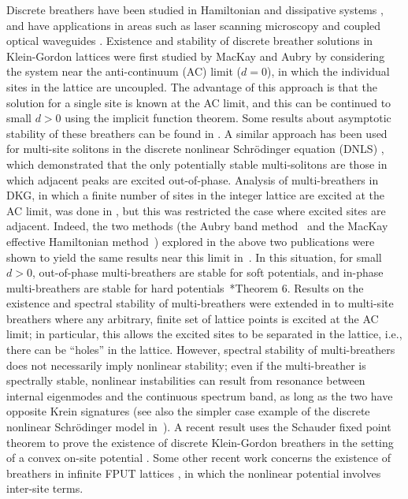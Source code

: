 \documentclass[12pt,reqno]{amsart}
\theoremstyle{definition}
\begin{document}
Discrete breathers have been studied in Hamiltonian \cite{Flach1998} and dissipative systems \cite{Flach2008a}, and have applications in areas such as laser scanning microscopy and coupled optical waveguides \cites{Flach2008,LEDERER20081}. Existence and stability of discrete breather solutions in Klein-Gordon lattices were first studied by MacKay and Aubry \cites{MacKay1994,Aubry1997} by considering the system near the anti-continuum (AC) limit ($d=0$), in which the individual sites in the lattice are uncoupled. The advantage of this approach is that the solution for a single site is known at the AC limit, and this can be continued to small $d>0$ using the implicit function theorem. Some results about asymptotic stability of these breathers can be found in \cite{Bambusi2013}. A similar approach has been used for multi-site solitons in the discrete nonlinear Schr\"odinger equation (DNLS) \cites{Pelinovsky2005,KALOSAKAS200644}, which demonstrated that the only 
potentially stable multi-solitons are those in which adjacent peaks are excited out-of-phase. Analysis of multi-breathers in DKG, in which a finite number of sites in the integer lattice are excited at the AC limit, was done in \cites{Archilla2003,Koukouloyannis2009}, but this was restricted the case where excited sites are adjacent.
Indeed, the two methods (the Aubry band method~\cite{Aubry1997} and the MacKay
effective Hamiltonian method~\cite{sepulchre}) explored in the above two publications
were shown to yield the same results near this limit 
in~\cite{doi:10.1142/S0218127411029690}.
In this situation, for small $d>0$, out-of-phase multi-breathers are stable for soft potentials, and in-phase multi-breathers are stable for hard potentials~\cite{Archilla2003}*{Theorem 6}. Results on the existence and spectral stability of multi-breathers were extended in \cite{Pelinovsky2012} to multi-site breathers where any arbitrary, finite set of lattice points is excited at the AC limit; in particular, this allows the excited sites to be separated in the lattice, i.e., there can be ``holes'' in the lattice. However, spectral stability of multi-breathers does not necessarily imply nonlinear stability; even if the multi-breather is spectrally stable, nonlinear instabilities can result from resonance between internal eigenmodes and the continuous spectrum band, as long as the two have opposite Krein signatures \cite{cuevas-maraver2016}
(see also the simpler case example of the discrete
nonlinear Schr{\"o}dinger model in~\cite{PhysRevLett.114.214101}). A recent result uses the Schauder fixed point theorem to prove the existence of discrete Klein-Gordon breathers in the setting of a convex on-site potential \cite{hennig2021}. Some other recent work concerns the existence of breathers in infinite FPUT lattices \cites{Arioli2019,yoshimura2021}, in which the nonlinear potential involves inter-site terms.
\end{document}
